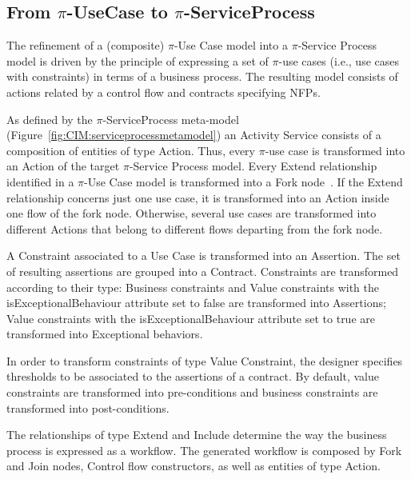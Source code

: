\documentclass{singlecol-new}
\theoremstyle{TH}{
\newtheorem{lemma}{Lemma}
\newtheorem{theorem}[lemma]{Theorem}
\newtheorem{corrolary}[lemma]{Corrolary}
\newtheorem{conjecture}[lemma]{Conjecture}
\newtheorem{proposition}[lemma]{Proposition}
\newtheorem{claim}[lemma]{Claim}
\newtheorem{stheorem}[lemma]{Wrong Theorem}
\newtheorem{algorithm}{Algorithm}
}
\theoremstyle{THrm}{
\newtheorem{definition}{Definition}[section]
\newtheorem{question}{Question}[section]
\newtheorem{remark}{Remark}
\newtheorem{scheme}{Scheme}
}
\theoremstyle{THhit}{
\newtheorem{case}{Case}[section]
}
\theoremstyle{THhsl}{
\newtheorem{example}{Example}
}
\begin{document}
\subsection{From $\pi$-UseCase to $\pi$-ServiceProcess}

The refinement of a (composite) $\pi$-Use Case model into a $\pi$-Service Process model is driven by the principle of expressing a set of $\pi$-use cases (i.e., use cases with constraints)   in terms of  a business process.
The resulting model consists of actions related by a control flow and contracts specifying NFPs. 

As defined by the $\pi$-ServiceProcess  meta-model (Figure~\ref{fig:CIM:serviceprocessmetamodel}) an {\sc Activity Service} consists of a composition of  entities of type {\sc Action}. 
Thus, every {\sf $\pi$-use case} is transformed into an {\sf Action} of the target $\pi$-Service Process model.  
Every {\sf Extend} relationship identified in a $\pi$-Use Case model is
transformed into a  {\sf Fork node}~\cite{valeriaThesis}.%
If the {\sf Extend} relationship concerns just one {\sf use case}, it is transformed into an {\sf Action} inside one flow of the fork node. 
Otherwise, several  {\sf use cases} are transformed into different {\sf Actions} that belong to different flows departing from the fork node.   

%
A {\sf Constraint} associated to a {\sf Use Case}  is transformed into an  {\sf Assertion}.  
The set of resulting assertions  are grouped into a {\sf Contract}.
Constraints are transformed according to their type:
{\sc Business} constraints and {\sc Value} constraints with the {\sf  isExceptionalBehaviour} at\-tri\-bute set to false are transformed into {\sf Assertion}s;
{\sc Value } constraints with the {\sf  isExceptionalBehaviour} attribute set to true are transformed into {\sf Exceptional behavior}s.

In order to transform constraints of type {\sf Value Constraint}, the designer specifies thresholds to be associated to the assertions of a contract.
By default, value constraints are transformed into pre-conditions and business constraints are transformed into post-conditions. 
  
The relationships of type  {\sc Extend} and {\sc Include}  determine the way the business process is expressed as a workflow.  
The generated workflow is composed by {\sf Fork} and {\sf Join} nodes,  {\sc Control flow} constructors, as well as entities of type {\sc Action}.
\end{document}
